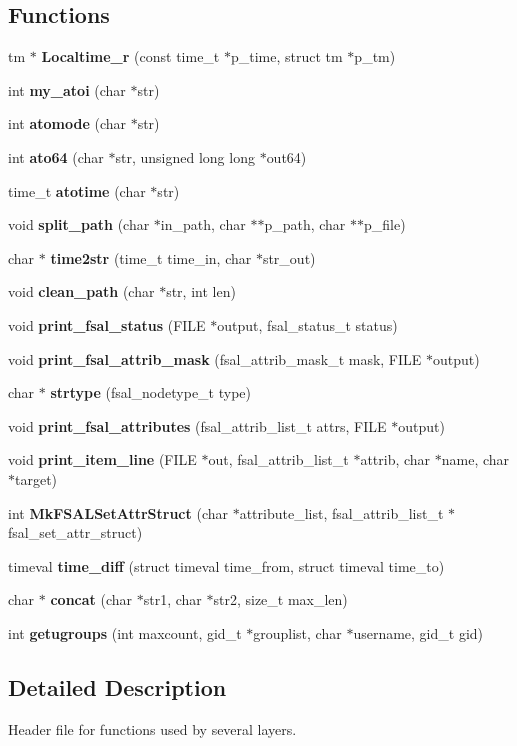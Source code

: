 \subsection*{Functions}
\begin{CompactItemize}
\item 
tm $\ast$ {\bf Localtime\_\-r} (const time\_\-t $\ast$p\_\-time, struct tm $\ast$p\_\-tm)
\item 
int {\bf my\_\-atoi} (char $\ast$str)
\item 
int {\bf atomode} (char $\ast$str)
\item 
int {\bf ato64} (char $\ast$str, unsigned long long $\ast$out64)
\item 
time\_\-t {\bf atotime} (char $\ast$str)
\item 
void {\bf split\_\-path} (char $\ast$in\_\-path, char $\ast$$\ast$p\_\-path, char $\ast$$\ast$p\_\-file)
\item 
char $\ast$ {\bf time2str} (time\_\-t time\_\-in, char $\ast$str\_\-out)
\item 
void {\bf clean\_\-path} (char $\ast$str, int len)
\item 
void {\bf print\_\-fsal\_\-status} (FILE $\ast$output, fsal\_\-status\_\-t status)
\item 
void {\bf print\_\-fsal\_\-attrib\_\-mask} (fsal\_\-attrib\_\-mask\_\-t mask, FILE $\ast$output)
\item 
char $\ast$ {\bf strtype} (fsal\_\-nodetype\_\-t type)
\item 
void {\bf print\_\-fsal\_\-attributes} (fsal\_\-attrib\_\-list\_\-t attrs, FILE $\ast$output)
\item 
void {\bf print\_\-item\_\-line} (FILE $\ast$out, fsal\_\-attrib\_\-list\_\-t $\ast$attrib, char $\ast$name, char $\ast$target)
\item 
int {\bf Mk\-FSALSet\-Attr\-Struct} (char $\ast$attribute\_\-list, fsal\_\-attrib\_\-list\_\-t $\ast$fsal\_\-set\_\-attr\_\-struct)
\item 
timeval {\bf time\_\-diff} (struct timeval time\_\-from, struct timeval time\_\-to)
\item 
char $\ast$ {\bf concat} (char $\ast$str1, char $\ast$str2, size\_\-t max\_\-len)
\item 
int {\bf getugroups} (int maxcount, gid\_\-t $\ast$grouplist, char $\ast$username, gid\_\-t gid)
\end{CompactItemize}


\subsection{Detailed Description}
Header file for functions used by several layers. 

